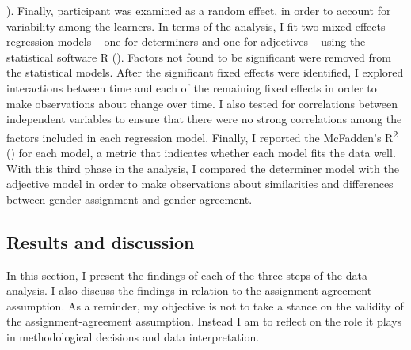 \documentclass[output=paper,colorlinks,citecolor=brown,modfonts,nonflat]{../langscibook}
\begin{document}
\citealt{Bartning2000,DewaeleVéronique2001}). Finally, participant was examined as a random effect, in order to account for variability among the learners. In terms of the analysis, I fit two mixed-effects regression models – one for determiners and one for adjectives – using the statistical software R (\citealt{RCoreTeam2017}). Factors not found to be significant were removed from the statistical models. After the significant fixed effects were identified, I explored interactions between time and each of the remaining fixed effects in order to make observations about change over time. I also tested for correlations between independent variables to ensure that there were no strong correlations among the factors included in each regression model. Finally, I reported the McFadden’s R\textsuperscript{2} (\citealt{SmithMcKenna2013}) for each model, a metric that indicates whether each model fits the data well. With this third phase in the analysis, I compared the determiner model with the adjective model in order to make observations about similarities and differences between gender assignment and gender agreement.


\subsection{Results and discussion}\label{sec:gudmestad:3.2}

In this section, I present the findings of each of the three steps of the data analysis. I also discuss the findings in relation to the assignment-agreement assumption. As a reminder, my objective is not to take a stance on the validity of the assignment-agreement assumption. Instead I am to reflect on the role it plays in methodological decisions and data interpretation. 
\end{document}
